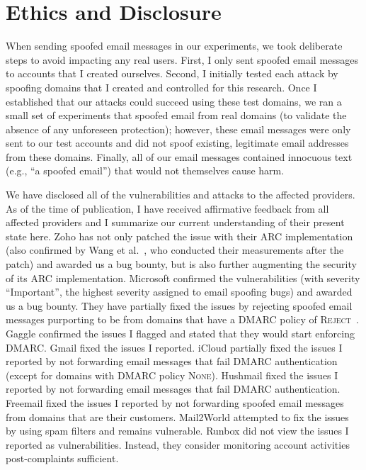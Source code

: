 \section{Ethics and Disclosure}
\label{sec:disclosure}
When sending spoofed email messages in our experiments,
we took deliberate steps to avoid impacting any real users.
First, I only sent spoofed email messages to accounts that I created ourselves.
Second, I initially tested each attack by spoofing domains that I created and controlled for this research.
Once I established that our attacks could succeed using these test domains,
we ran a small set of experiments that spoofed email from real domains (to validate the absence of any unforeseen protection);
however, these email messages were only sent to our test accounts and did not spoof existing, legitimate email addresses from these domains.
Finally, all of our email messages contained innocuous text (e.g., ``a spoofed email'') that would not themselves cause harm.

We have disclosed all of the vulnerabilities and attacks to the
affected providers. As of the time of publication, I have received
affirmative feedback from all affected providers and I summarize our
current understanding of their present state here. Zoho has not only
patched the issue with their ARC implementation (also confirmed by
Wang et al.~\cite{wang2022revisiting}, who conducted their
measurements after the patch) and awarded us a bug bounty, but is also
further augmenting the security of its ARC implementation. Microsoft
confirmed the vulnerabilities (with severity ``Important'', the
highest severity assigned to email spoofing bugs) and awarded us a bug
bounty. They have partially fixed the issues by rejecting spoofed email
messages purporting to be from domains that have a DMARC policy of
\textsc{Reject}~\cite{hotmailreject}.
Gaggle confirmed the issues I flagged and stated that they would
start enforcing DMARC. Gmail fixed the issues I reported.  iCloud
partially fixed the issues I reported by not forwarding email
messages that fail DMARC authentication (except for domains with DMARC
policy \textsc{None}). Hushmail fixed the issues I reported by not
forwarding email messages that fail DMARC authentication. Freemail
fixed the issues I reported by not forwarding spoofed email messages
from domains that are their customers. Mail2World attempted to fix the
issues by using spam filters and remains vulnerable. Runbox did not
view the issues I reported as vulnerabilities. Instead, they consider
monitoring account activities post-complaints sufficient.
